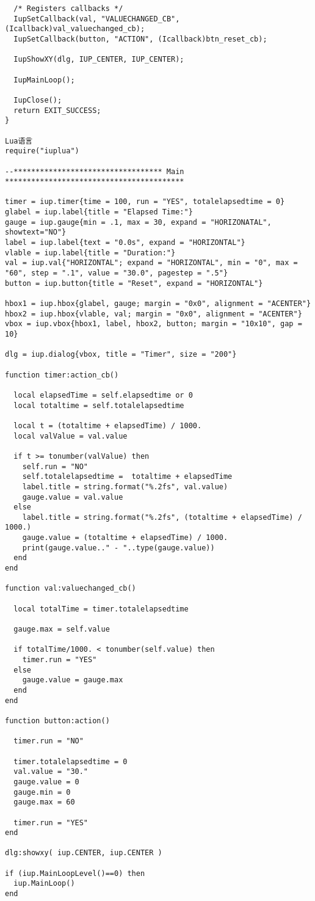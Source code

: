 \documentclass{ctexart}
\begin{document}
\begin{lstlisting}
  /* Registers callbacks */
  IupSetCallback(val, "VALUECHANGED_CB", (Icallback)val_valuechanged_cb);
  IupSetCallback(button, "ACTION", (Icallback)btn_reset_cb);

  IupShowXY(dlg, IUP_CENTER, IUP_CENTER);

  IupMainLoop();

  IupClose();
  return EXIT_SUCCESS;
}

Lua语言
require("iuplua")

--********************************** Main *****************************************

timer = iup.timer{time = 100, run = "YES", totalelapsedtime = 0}
glabel = iup.label{title = "Elapsed Time:"}
gauge = iup.gauge{min = .1, max = 30, expand = "HORIZONATAL", showtext="NO"}
label = iup.label{text = "0.0s", expand = "HORIZONTAL"}
vlable = iup.label{title = "Duration:"}
val = iup.val{"HORIZONTAL"; expand = "HORIZONTAL", min = "0", max = "60", step = ".1", value = "30.0", pagestep = ".5"}
button = iup.button{title = "Reset", expand = "HORIZONTAL"}

hbox1 = iup.hbox{glabel, gauge; margin = "0x0", alignment = "ACENTER"}
hbox2 = iup.hbox{vlable, val; margin = "0x0", alignment = "ACENTER"}
vbox = iup.vbox{hbox1, label, hbox2, button; margin = "10x10", gap = 10}

dlg = iup.dialog{vbox, title = "Timer", size = "200"}

function timer:action_cb()

  local elapsedTime = self.elapsedtime or 0
  local totaltime = self.totalelapsedtime
  
  local t = (totaltime + elapsedTime) / 1000.
  local valValue = val.value
  
  if t >= tonumber(valValue) then
    self.run = "NO"
    self.totalelapsedtime =  totaltime + elapsedTime
    label.title = string.format("%.2fs", val.value)
    gauge.value = val.value
  else
    label.title = string.format("%.2fs", (totaltime + elapsedTime) / 1000.)
    gauge.value = (totaltime + elapsedTime) / 1000.
	print(gauge.value.." - "..type(gauge.value))
  end
end

function val:valuechanged_cb()

  local totalTime = timer.totalelapsedtime

  gauge.max = self.value

  if totalTime/1000. < tonumber(self.value) then
    timer.run = "YES"
  else
    gauge.value = gauge.max
  end
end

function button:action()

  timer.run = "NO"

  timer.totalelapsedtime = 0
  val.value = "30."
  gauge.value = 0
  gauge.min = 0
  gauge.max = 60

  timer.run = "YES"
end

dlg:showxy( iup.CENTER, iup.CENTER )

if (iup.MainLoopLevel()==0) then
  iup.MainLoop()
end
\end{lstlisting}
\end{document}
